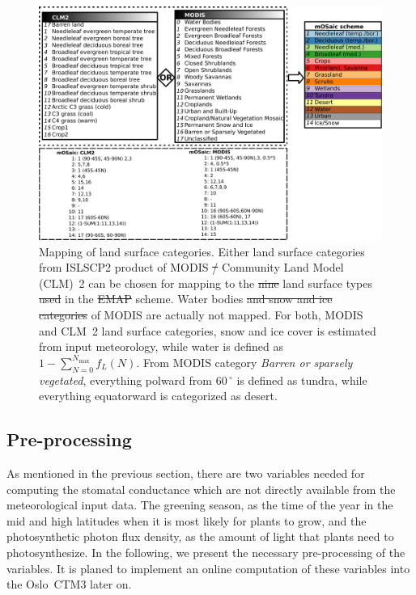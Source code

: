 \documentclass[gmd, manuscript]{copernicus}
\providecommand{\DIFadd}[1]{{\protect\color{blue}\uwave{#1}}} %
\providecommand{\DIFdel}[1]{{\protect\color{red}\sout{#1}}}                      %
\providecommand{\DIFdelend}{} %
\providecommand{\DIFaddFL}[1]{\DIFadd{#1}} %
\providecommand{\DIFdelFL}[1]{\DIFdel{#1}} %
\providecommand{\DIFaddbeginFL}{} %
\providecommand{\DIFaddendFL}{} %
\providecommand{\DIFdelbeginFL}{} %
\providecommand{\DIFdelendFL}{} %
\begin{document}
\DIFdelend \begin{figure}[t]
  \includegraphics[width=12cm]{fig02}
  \caption{Mapping of land surface categories. Either land surface categories from ISLSCP2 product of MODIS \DIFdelbeginFL \DIFdelFL{/  }\DIFdelendFL \DIFaddbeginFL \DIFaddFL{or the }\DIFaddendFL Community Land Model (CLM)~2 can be chosen for mapping to the \DIFdelbeginFL \DIFdelFL{nine }\DIFdelendFL land surface types \DIFdelbeginFL \DIFdelFL{used }\DIFdelendFL \DIFaddbeginFL \DIFaddFL{we use }\DIFaddendFL in the \DIFdelbeginFL \DIFdelFL{EMAP }\DIFdelendFL \DIFaddbeginFL \DIFaddFL{mOSaic }\DIFaddendFL scheme. Water bodies \DIFdelbeginFL \DIFdelFL{and snow and ice categories }\DIFdelendFL of MODIS are actually not mapped. For both, MODIS and CLM~2 land surface categories, snow and ice cover is estimated from input meteorology, while water is defined as \DIFdelbeginFL \DIFdelFL{$1-\sum_{N=0}^{N_\text{max}} f_L(N)$}\DIFdelendFL \DIFaddbeginFL \DIFaddFL{$1-\sum_{k} f_L^k$}\DIFaddendFL . From MODIS category \emph{Barren or sparsely vegetated}, everything polward from $60\,\unit{^\circ}$ is defined as tundra, while everything equatorward is categorized as desert.}
  \label{fig:pft_mapping}
\end{figure}
%
\subsection{Pre-processing}
\label{subsec:pre-pro}
As mentioned in the previous section, there are two variables needed for computing the stomatal conductance which are not directly available from the meteorological input data. The greening season, as the time of the year in the mid and high latitudes when it is most likely for plants to grow, and the photosynthetic photon flux density, as the amount of light that plants need to photosynthesize. In the following, we present the necessary pre-processing of the variables. It is planed to implement an online computation of these variables into the Oslo~CTM3 later on.
\end{document}
